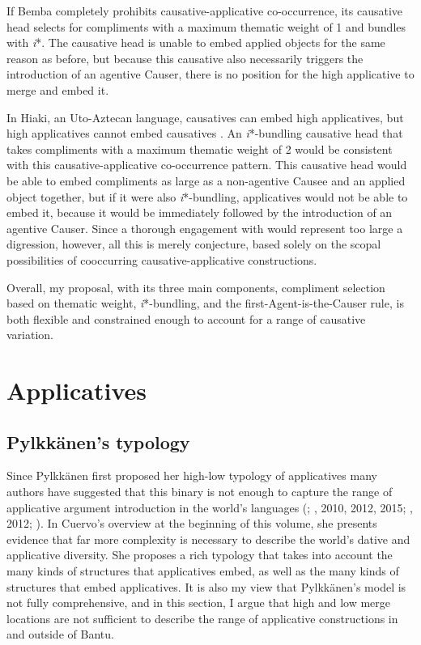 \documentclass[output=paper,modfonts,nonflat]{langsci/langscibook}
\begin{document}
If Bemba completely prohibits causative-applicative co-occurrence, its causative head selects for compliments with a maximum thematic weight of 1 and bundles with \textit{i}*. The causative head is unable to embed applied objects for the same reason as before, but because this causative also necessarily triggers the introduction of an agentive Causer, there is no position for the high applicative to merge and embed it. 



In Hiaki, an Uto-Aztecan language, causatives can embed high applicatives, but high applicatives cannot embed causatives \citep{Jung2014}. An \textit{i}*-bundling causative head that takes compliments with a maximum thematic weight of 2 would be consistent with this causative-applicative co-occurrence pattern. This causative head would be able to embed compliments as large as a non-agentive Causee and an applied object together, but if it were also \textit{i}*-bundling, applicatives would not be able to embed it, because it would be immediately followed by the introduction of an agentive Causer. Since a thorough engagement with \citet{Jung2014} would represent too large a digression, however, all this is merely conjecture, based solely on the scopal possibilities of cooccurring causative-applicative constructions. 


Overall, my proposal, with its three main components, compliment selection based on thematic weight, \textit{i}*-bundling, and the first-Agent-is-the-Causer rule, is both flexible and constrained enough to account for a range of causative variation. 

\section{Applicatives}\label{sec:wechsler:3}

\subsection{Pylkkänen’s typology}\label{sec:wechsler:3.1}

Since Pylkkänen first proposed her high-low typology of applicatives \citeyear{Pylkkänen2002} many authors have suggested that this binary is not enough to capture the range of applicative argument introduction in the world’s languages (\citealt{Jeong2007,Peterson2007};  \citealt{GeorgalaEtAl2008,Cuervo2003}, 2010, 2012, 2015; \citealt{Tsai2009,Kim2011}, 2012; \citealt{Georgala2012}). In Cuervo’s overview at the beginning of this volume, she presents evidence that far more complexity is necessary to describe the world’s dative and applicative diversity. She proposes a rich typology that takes into account the many kinds of structures that applicatives embed, as well as the many kinds of structures that embed applicatives. It is also my view that Pylkkänen’s model is not fully comprehensive, and in this section, I argue that high and low merge locations are not sufficient to describe the range of applicative constructions in and outside of Bantu. 
\end{document}
